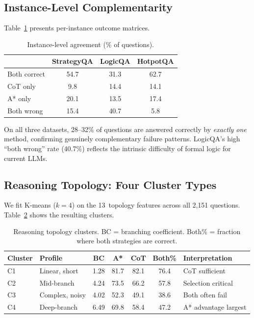 \documentclass{article}
\begin{document}
\subsection{Instance-Level Complementarity}
\label{sec:complementarity}

Table~\ref{tab:complementarity} presents per-instance outcome matrices.

\begin{table}[t]
\centering
\caption{Instance-level agreement (\% of questions).}
\label{tab:complementarity}
\small
\begin{tabular}{@{}lccc@{}}
\toprule
& \textbf{StrategyQA} & \textbf{LogicQA} & \textbf{HotpotQA} \\
\midrule
Both correct & 54.7 & 31.3 & 62.7 \\
CoT only     &  9.8 & 14.4 & 14.1 \\
A* only      & 20.1 & 13.5 & 17.4 \\
Both wrong   & 15.4 & 40.7 &  5.8 \\
\bottomrule
\end{tabular}
\end{table}

On all three datasets, 28--32\% of questions are answered correctly by
\emph{exactly one} method, confirming genuinely complementary failure patterns.
LogicQA's high ``both wrong'' rate (40.7\%) reflects the intrinsic difficulty
of formal logic for current LLMs.

\subsection{Reasoning Topology: Four Cluster Types}
\label{sec:topology}

We fit K-means ($k{=}4$) on the 13~topology features across all 2,151
questions.  Table~\ref{tab:topology} shows the resulting clusters.

\begin{table}[t]
\centering
\caption{Reasoning topology clusters.  BC = branching coefficient.  Both\% =
fraction where both strategies are correct.}
\label{tab:topology}
\small
\begin{tabular}{@{}llccccp{3.2cm}@{}}
\toprule
\textbf{Cluster} & \textbf{Profile} & \textbf{BC} & \textbf{A*} & \textbf{CoT}
  & \textbf{Both\%} & \textbf{Interpretation} \\
\midrule
C1 & Linear, short  & 1.28 & 81.7 & 82.1 & 76.4 & CoT sufficient \\
C2 & Mid-branch     & 4.24 & 73.5 & 66.2 & 57.8 & Selection critical \\
C3 & Complex, noisy & 4.02 & 52.3 & 49.1 & 38.6 & Both often fail \\
C4 & Deep-branch    & 6.49 & 69.8 & 58.4 & 47.2 & A* advantage largest \\
\bottomrule
\end{tabular}
\end{table}
\end{document}
